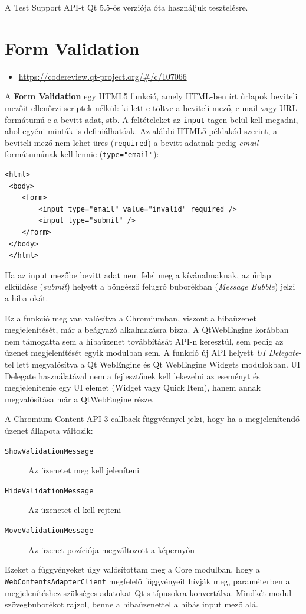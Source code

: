 \documentclass[12pt]{report}
\let\origurl\url
\renewcommand{\url}[1]{%
    \textcolor{blue}{\origurl{#1}}
}
\newcommand{\gerrit}[1]{%
    \textcolor{qtgreen}{\origurl{https://codereview.qt-project.org/\#/c/#1}}
}
\begin{document}
A Test Support API-t Qt 5.5-ös verziója óta használjuk tesztelésre.


\section{Form Validation}

\begin{center}
    \begin{reviewbox}
        \begin{itemize}
            \renewcommand{\labelitemi}{\textcolor{qtgreen}{$\blacktriangleright$}}
            \item \gerrit{107066}
        \end{itemize}
    \end{reviewbox}
\end{center}

\noindent
A \textbf{Form Validation} egy HTML5 funkció, amely HTML-ben írt űrlapok beviteli
mezőit ellenőrzi scriptek nélkül: ki lett-e töltve a beviteli mező, e-mail vagy URL
formátumú-e a bevitt adat, stb. A feltételeket az \texttt{input} tagen belül kell megadni,
ahol egyéni minták is definiálhatóak. Az alábbi HTML5 példakód szerint, a beviteli mező
nem lehet üres (\texttt{required}) a bevitt adatnak pedig \textit{email} formátumúnak kell
lennie (\texttt{type="email"}):
\begin{lstlisting}[title=form.html]
 <html>
 <body>
    <form>
        <input type="email" value="invalid" required />
        <input type="submit" />
    </form>
 </body>
 </html>
\end{lstlisting}
Ha az input mezőbe bevitt adat nem felel meg a kívánalmaknak, az űrlap elküldése
(\textit{submit}) helyett a böngésző felugró buborékban (\textit{Message Bubble}) jelzi a
hiba okát.

Ez a funkció meg van valósítva a Chromiumban, viszont a hibaüzenet megjelenítését, már
a beágyazó alkalmazásra bízza. A QtWebEngine korábban nem támogatta sem a hibaüzenet
továbbítását API-n keresztül, sem pedig az üzenet megjelenítését egyik modulban sem.
A funkció új API helyett \textit{UI Delegate}-tel lett megvalósítva a Qt WebEngine és
Qt WebEngine Widgets modulokban. UI Delegate használatával nem a fejlesztőnek kell lekezelni
az eseményt és megjelenítenie egy UI elemet (Widget vagy Quick Item), hanem annak
megvalósítása már a QtWebEngine része.

A Chromium Content API 3 callback függvénnyel jelzi, hogy ha a megjelenítendő üzenet állapota
változik:
\begin{description}
    \item[\texttt{ShowValidationMessage}] Az üzenetet meg kell jeleníteni
    \item[\texttt{HideValidationMessage}] Az üzenetet el kell rejteni
    \item[\texttt{MoveValidationMessage}] Az üzenet pozíciója megváltozott a képernyőn
\end{description}
Ezeket a függvényeket úgy valósítottam meg a Core modulban, hogy a
\texttt{WebContentsAdapterClient} megfelelő függvényeit hívják meg, paraméterben
a megjelenítéshez szükséges adatokat Qt-s típusokra konvertálva. Mindkét modul
szövegbuborékot rajzol, benne a hibaüzenettel a hibás input mező alá.
\end{document}
